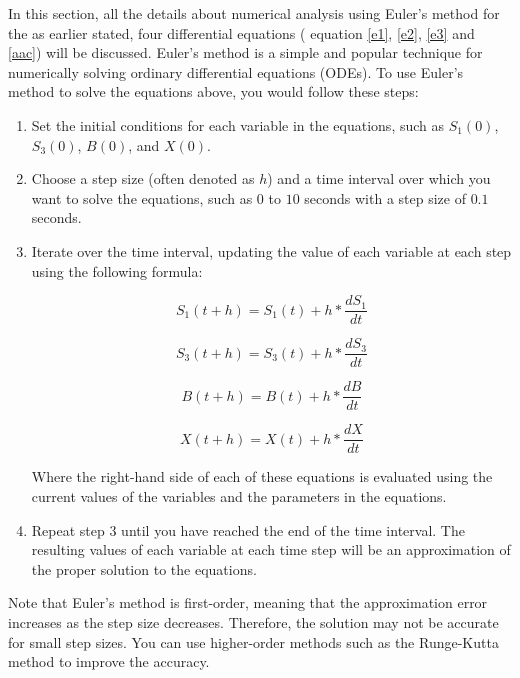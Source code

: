 In this section, all the details about numerical analysis using Euler's method for the as earlier stated, four differential equations ( equation \eqref{e1}, \eqref{e2}, \eqref{e3} and  \eqref{aac}) will be discussed. Euler's method is a simple and popular technique for numerically solving ordinary differential equations (ODEs). To use Euler's method to solve the equations above, you would follow these steps:

\begin{enumerate}
    \item Set the initial conditions for each variable in the equations, such as $S_1(0)$, $S_3(0)$, $B(0)$, and $X(0)$.
    \item Choose a step size (often denoted as $h$) and a time interval over which you want to solve the equations, such as $0$ to $10$ seconds with a step size of $0.1$ seconds.
    \item Iterate over the time interval, updating the value of each variable at each step using the following formula:

    \begin{equation}
        S_1(t + h) = S_1(t) + h * \frac{dS_1}{dt}
    \end{equation}

    \begin{equation}
        S_3(t + h) = S_3(t) + h * \frac{dS_3}{dt}
    \end{equation}

      \begin{equation}
        B(t + h) = B(t) + h * \frac{dB}{dt}
    \end{equation}

      \begin{equation}
        X(t + h) = X(t) + h * \frac{dX}{dt}
    \end{equation}

    Where the right-hand side of each of these equations is evaluated using the current values of the variables and the parameters in the equations.

\item Repeat step 3 until you have reached the end of the time interval. The resulting values of each variable at each time step will be an approximation of the proper solution to the equations.
 
\end{enumerate}


 Note that Euler's method is first-order, meaning that the approximation error increases as the step size decreases. Therefore, the solution may not be accurate for small step sizes. You can use higher-order methods such as the Runge-Kutta method to improve the accuracy.

